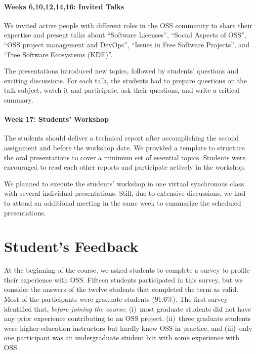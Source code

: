 \documentclass[sigconf]{acmart}
\begin{document}


\paragraph{\textbf{Weeks 6,10,12,14,16: Invited Talks}}

We invited active people with different roles in the OSS community 
to share their expertise and present talks about 
``Software Licenses'', ``Social Aspects of OSS'', ``OSS project management and DevOps'', ``Issues in Free Software Projects'', and ``Free Software Ecosystems (KDE)''.

The presentations introduced new topics, followed by students' questions and exciting discussions. 
For each talk, the students had to prepare questions on the talk subject, 
watch it and participate, ask their questions, and write a critical summary.

\paragraph{\textbf{Week 17: Students' Workshop}}

The students should deliver a technical report after accomplishing the second assignment and before the workshop date.
We provided a template to structure the oral presentations to cover a minimum set of essential topics. Students were encouraged to read each other reports and participate actively in the workshop.

We planned to execute the students' workshop in one virtual synchronous class with several individual presentations. Still, due to extensive discussions, we had to attend an additional meeting in the same week to summarize the scheduled presentations.

\section{Student's Feedback}
\label{sec:students_feedback}

At the beginning of the course, we asked students to complete a survey to profile their experience with OSS.
Fifteen students participated in this survey, but we consider the answers of the twelve students that completed the term as valid.
%
Most of the participants were graduate students (91.6\%). 
The first survey identified that, \textit{before joining the course}:
(i)~most graduate students did not have any prior experience contributing to an OSS project, 
(ii)~three graduate students were higher-education instructors but hardly knew OSS in practice, 
and (iii)~only one participant was an undergraduate student but with some experience with OSS.
\end{document}
